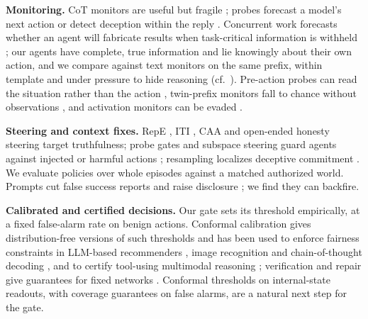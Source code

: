 \documentclass{article}
\begin{document}
\textbf{Monitoring.} CoT monitors are useful but fragile \citep{baker2025monitoring,korbak2025cot,chen2025reasoning}; probes forecast a model's next action \citep{anthropic2024sleeperprobes,kortukov2026predicting,goodfire2026reward,bergen2026reward} or detect deception within the reply \citep{goldowskydill2025probes}. Concurrent work forecasts whether an agent will fabricate results when task-critical information is withheld \citep{li2026before}; our agents have complete, true information and lie knowingly about their own action, and we compare against text monitors on the same prefix, within template and under pressure to hide reasoning (cf.\ \citealp{das2026activations}). Pre-action probes can read the situation rather than the action \citep{fomin2026probes}, twin-prefix monitors fall to chance without observations \citep{han2026twin}, and activation monitors can be evaded \citep{keenan2026evade,gupta2025rlobf}.

\textbf{Steering and context fixes.} RepE \citep{zou2023repe}, ITI \citep{li2023iti}, CAA \citep{rimsky2024caa} and open-ended honesty steering \citep{herbster2026steer} target truthfulness; probe gates and subspace steering guard agents against injected or harmful actions \citep{dong2026ipi,luo2026mechsuits}; resampling localizes deceptive commitment \citep{merrill2026point}. We evaluate policies over whole episodes against a matched authorized world. Prompts cut false success reports \citep{zhu2026fta} and raise disclosure \citep{huang2026insecure}; we find they can backfire.

\textbf{Calibrated and certified decisions.} Our gate sets its threshold empirically, at a fixed false-alarm rate on benign actions. Conformal calibration gives distribution-free versions of such thresholds and has been used to enforce fairness constraints in LLM-based recommenders \citep{fayyazi2025facter}, image recognition \citep{fayyazi2026fairsight} and chain-of-thought decoding \citep{fayyazi2026coft}, and to certify tool-using multimodal reasoning \citep{fayyazi2026pop}; verification and repair give guarantees for fixed networks \citep{fayyazi2025fairverify}. Conformal thresholds on internal-state readouts, with coverage guarantees on false alarms, are a natural next step for the gate.

\end{document}
